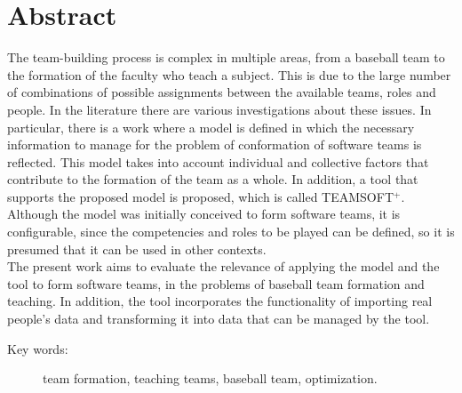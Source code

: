 
\section*{Abstract} 

The team-building process is complex in multiple areas, from a baseball team to the formation of the faculty who teach a subject. This is due to the large number of combinations of possible assignments between the available teams, roles and people. In the literature there are various investigations about these issues. In particular, there is a work where a model is defined in which the necessary information to manage for the problem of conformation of software teams is reflected. This model takes into account individual and collective factors that contribute to the formation of the team as a whole. In addition, a tool that supports the proposed model is proposed, which is called TEAMSOFT$^ +$. Although the model was initially conceived to form software teams, it is configurable, since the competencies and roles to be played can be defined, so it is presumed that it can be used in other contexts.\\

The present work aims to evaluate the relevance of applying the model and the tool to form software teams, in the problems of baseball team formation and teaching. In addition, the tool incorporates the functionality of importing real people's data and transforming it into data that can be managed by the tool.

\begin{description}
	\item[Key words:]{team formation, teaching teams, baseball team, optimization.}
\end{description}